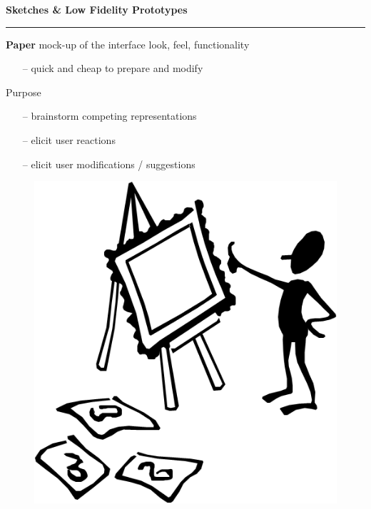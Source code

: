 \documentclass[pdf]{beamer}
\begin{document}
\begin{frame}
\vspace{8mm}
\textcolor{myBlue}{\textbf{\Large{Sketches \& Low Fidelity Prototypes}}}

\textcolor{red}{\rule{10cm}{1mm}}

\bigskip

{\LARGE \textbf{Paper} mock-up of the interface look, feel, functionality \LARGE}

\begin{itemize}
    \item[\textcolor{black}{--}] quick and cheap to prepare and modify
\end{itemize}

\bigskip

{\LARGE Purpose \LARGE}

\begin{itemize}
    \item[\textcolor{black}{--}] brainstorm competing representations
    \item[\textcolor{black}{--}] elicit user reactions
    \item[\textcolor{black}{--}] elicit user modifications / suggestions

\end{itemize}

\begin{figure}[b]
    	\begin{flushright}
    	\includegraphics[scale = 0.3]{14.PNG}
        \end{flushright}
        \end{figure}
\end{frame}
\end{document}
